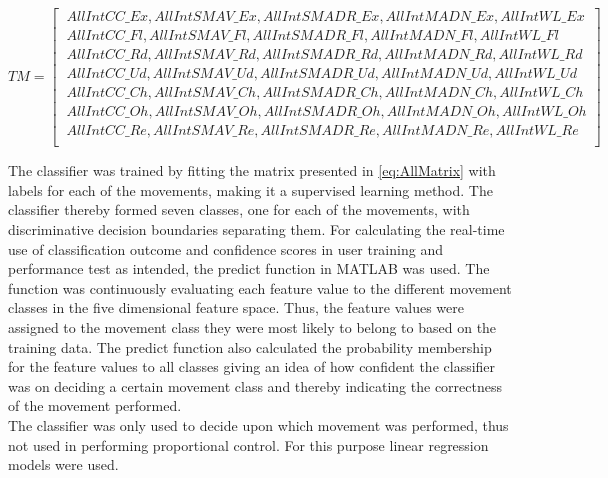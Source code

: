 \begin{footnotesize}
 \begin{equation} \label{eq:AllMatrix}
TM=\begin{bmatrix} 
\ AllIntCC\_Ex, AllIntSMAV\_Ex, AllIntSMADR\_Ex, AllIntMADN\_Ex, AllIntWL\_Ex \\
\ AllIntCC\_Fl, AllIntSMAV\_Fl, AllIntSMADR\_Fl, AllIntMADN\_Fl, AllIntWL\_Fl \\
\ AllIntCC\_Rd, AllIntSMAV\_Rd, AllIntSMADR\_Rd, AllIntMADN\_Rd, AllIntWL\_Rd \\
\ AllIntCC\_Ud, AllIntSMAV\_Ud, AllIntSMADR\_Ud, AllIntMADN\_Ud, AllIntWL\_Ud \\
\ AllIntCC\_Ch, AllIntSMAV\_Ch, AllIntSMADR\_Ch, AllIntMADN\_Ch, AllIntWL\_Ch \\
\ AllIntCC\_Oh, AllIntSMAV\_Oh, AllIntSMADR\_Oh, AllIntMADN\_Oh, AllIntWL\_Oh \\
\ AllIntCC\_Re, AllIntSMAV\_Re, AllIntSMADR\_Re, AllIntMADN\_Re, AllIntWL\_Re \\
\end{bmatrix}
\end{equation}
\end{footnotesize}

The classifier was trained by fitting the matrix presented in \eqref{eq:AllMatrix} with labels for each of the movements, making it a supervised learning method. The classifier thereby formed seven classes, one for each of the movements, with discriminative decision boundaries separating them. For calculating the real-time use of classification outcome and confidence scores in user training and performance test as intended, the predict function in MATLAB was used. The function was continuously evaluating each feature value to the different movement classes in the five dimensional feature space. Thus, the feature values were assigned to the movement class they were most likely to belong to based on the training data. The predict function also calculated the probability membership for the feature values to all classes giving an idea of how confident the classifier was on deciding a certain movement class and thereby indicating the correctness of the movement performed. \\ 
The classifier was only used to decide upon which movement was performed, thus not used in performing proportional control. For this purpose linear regression models were used. 


